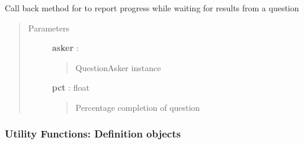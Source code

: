 \documentclass[letterpaper,10pt,english]{sphinxmanual}
\begin{document}

\begin{fulllineitems}
\label{pytan.utils:pytan.utils.question_progress}
Call back method for {\hyperref[taniumpy.question_asker:taniumpy.question_asker.QuestionAsker.run]{}} to report progress while waiting for results from a question
\begin{quote}\begin{description}
\item[{Parameters}] \leavevmode
\textbf{asker} : {\hyperref[taniumpy.question_asker:taniumpy.question_asker.QuestionAsker]{}}
\begin{quote}

QuestionAsker instance
\end{quote}

\textbf{pct} : float
\begin{quote}

Percentage completion of question
\end{quote}

\end{description}\end{quote}

\end{fulllineitems}



\subsubsection{Utility Functions: Definition objects}
\label{pytan.utils:utility-functions-definition-objects}
\end{document}
